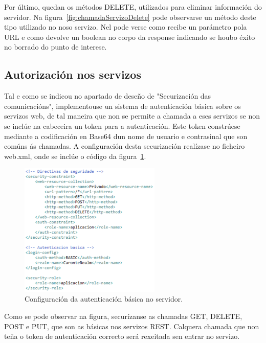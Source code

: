 Por último, quedan os métodos DELETE, utilizados para eliminar información do servidor. Na figura~\ref{fig:chamadaServizoDelete} pode observarse un método deste tipo utilizado no noso servizo. Nel pode verse como recibe un parámetro pola URL e como devolve un boolean no corpo da response indicando se houbo éxito no borrado do punto de interese.


\subsection{Autorización nos servizos}
Tal e como se indicou no apartado de deseño de "Securización das comunicacións", implementouse un sistema de autenticación básica sobre os servizos web, de tal maneira que non se permite a chamada a eses servizos se non se inclúe na cabeceira un token para a autenticación. Este token constrúese mediante a codificación en Base64 dun nome de usuario e contrasinal que son comúns ás chamadas. A configuración desta securización realízase no ficheiro web.xml, onde se inclúe o código da figura~\ref{fig:configuracionAutenticacion}.

\begin{figure}[htb] 
	\begin{center}
		\includegraphics[width=0.6\textwidth]{figures/codigo/configuracionAutenticacion}
		\caption{Configuración da autenticación básica no servidor.}
		\label{fig:configuracionAutenticacion}
	\end{center}
\end{figure}

Como se pode observar na figura, securízanse as chamadas GET, DELETE, POST e PUT, que son as básicas nos servizos REST. Calquera chamada que non teña o token de autenticación correcto será rexeitada sen entrar no servizo.


